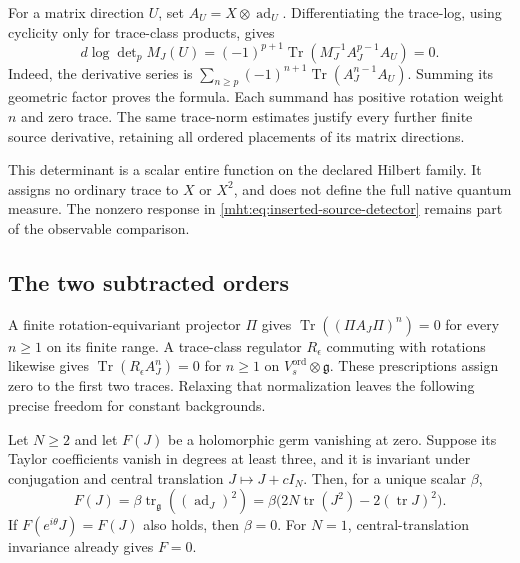 For a matrix direction $U$, set $A_U=X\otimes\operatorname{ad}_U$.
Differentiating the trace-log, using cyclicity only for trace-class
products, gives
\begin{equation}\label{mht:eq:neumann-determinant-connection}
 d\log\det\nolimits_p M_J(U)
   =(-1)^{p+1}\operatorname{Tr}
                   (M_J^{-1}A_J^{p-1}A_U)=0.
\end{equation}
Indeed, the derivative series is
$\sum_{n\geq p}(-1)^{n+1}\operatorname{Tr}(A_J^{n-1}A_U)$.
Summing its geometric factor proves the formula. Each summand
has positive rotation weight $n$ and zero trace. The same
trace-norm estimates justify every further finite source
derivative, retaining all ordered placements of its matrix
directions.

This determinant is a scalar entire function on the declared
Hilbert family. It assigns no ordinary trace to $X$ or $X^2$,
and does not define the full native quantum measure. The
nonzero response in \eqref{mht:eq:inserted-source-detector}
remains part of the observable comparison.

\subsection{The two subtracted orders}

A finite rotation-equivariant projector $\Pi$ gives
$\operatorname{Tr}((\Pi A_J\Pi)^n)=0$ for every $n\geq1$ on
its finite range. A trace-class regulator $R_\epsilon$ commuting
with rotations likewise gives
$\operatorname{Tr}(R_\epsilon A_J^n)=0$ for $n\geq1$ on
$V_s^{\mathrm{ord}}\otimes\mathfrak g$. These prescriptions assign zero to
the first two traces. Relaxing that normalization leaves the
following precise freedom for constant backgrounds.

\begin{proposition}\label{mht:prop:determinant-quadratic-normalization}
Let $N\geq2$ and let $F(J)$ be a holomorphic germ vanishing at zero.
Suppose its Taylor coefficients vanish in degrees at least three,
and it is invariant under conjugation and central translation
$J\mapsto J+cI_N$. Then, for a unique scalar $\beta$,
\begin{equation}\label{mht:eq:determinant-quadratic-normalization}
 F(J)=\beta\operatorname{tr}_{\mathfrak g}
                         ((\operatorname{ad}_J)^2)
     =\beta\bigl(2N\operatorname{tr}(J^2)
                           -2(\operatorname{tr}J)^2\bigr).
\end{equation}
If $F(e^{i\theta}J)=F(J)$ also holds, then $\beta=0$.
For $N=1$, central-translation invariance already gives $F=0$.
\end{proposition}

